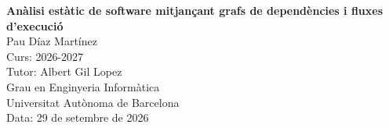 \begin{titlepage}

\vspace*{\fill}

\begin{center}

    {\Large\textbf{Anàlisi estàtic de software mitjançant grafs de dependències i fluxes d'execució}}\\[0.5em]

    Pau Díaz Martínez\\
    Curs: 2026-2027\\
    Tutor: Albert Gil Lopez\\
    Grau en Enginyeria Informàtica\\
    Universitat Autònoma de Barcelona\\
    Data: 29 de setembre de 2026

\end{center}

\vspace*{\fill}

\end{titlepage}